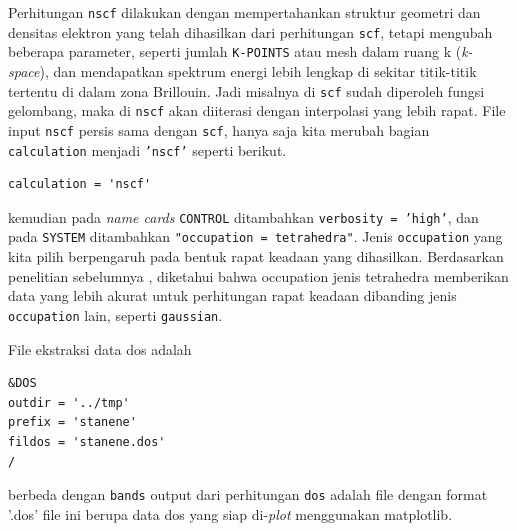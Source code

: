 Perhitungan \texttt{nscf} dilakukan dengan mempertahankan struktur geometri dan densitas elektron yang telah dihasilkan dari perhitungan \texttt{scf}, tetapi mengubah beberapa parameter, seperti jumlah \texttt{K-POINTS} atau mesh dalam ruang k (\textit{k-space}), dan mendapatkan spektrum energi lebih lengkap di sekitar titik-titik tertentu di dalam zona Brillouin. Jadi misalnya di \texttt{scf} sudah diperoleh fungsi gelombang, maka di \texttt{nscf} akan diiterasi dengan interpolasi yang lebih rapat. File input \texttt{nscf} persis sama dengan \texttt{scf}, hanya saja kita merubah bagian \texttt{calculation} menjadi \texttt{'nscf'} seperti berikut.
\begin{lstlisting}
calculation = 'nscf'
\end{lstlisting}
kemudian pada \textit{name cards} \texttt{CONTROL} ditambahkan \texttt{verbosity = 'high'}, dan pada \texttt{SYSTEM} ditambahkan \texttt{"occupation = tetrahedra"}. Jenis \texttt{occupation} yang kita pilih berpengaruh pada bentuk rapat keadaan yang dihasilkan.
Berdasarkan penelitian sebelumnya \citep{toriyama2021comparison}, diketahui bahwa occupation jenis tetrahedra memberikan data yang lebih akurat untuk perhitungan rapat keadaan dibanding jenis \texttt{occupation} lain, seperti \texttt{gaussian}.

File ekstraksi data dos adalah
\begin{lstlisting}
&DOS
outdir = '../tmp'
prefix = 'stanene'
fildos = 'stanene.dos'
/
\end{lstlisting}
berbeda dengan \texttt{bands} output dari perhitungan \texttt{dos} adalah file dengan format '.dos' file ini berupa data dos yang siap di-\textit{plot} menggunakan matplotlib.